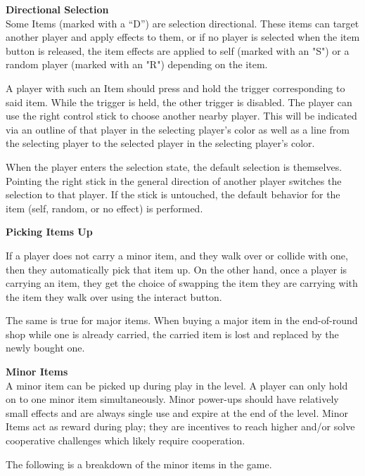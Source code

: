 \par
\textbf{Directional Selection}
\label{sec:dir-sel}
\\
Some Items (marked with a “D”) are selection directional. These items can target another player and apply effects to them, or if no player is selected when the item button is released, the item effects are applied to self (marked with an "S") or a random player (marked with an "R") depending on the item.
\par
A player with such an Item should press and hold the trigger corresponding to said item. While the trigger is held, the other trigger is disabled. The player can use the right control stick to choose another nearby player. This will be indicated via an outline of that player in the selecting player’s color as well as a line from the selecting player to the selected player in the selecting player’s color.
\par
When the player enters the selection state, the default selection is themselves. Pointing the right stick in the general direction of another player switches the selection to that player. If the stick is untouched, the default behavior for the item (self, random, or no effect) is performed.

\textbf{Picking Items Up}

If a player does not carry a minor item, and they walk over or collide with one, then they automatically pick that item up. On the other hand, once a player is carrying an item, they get the choice of swapping the item they are carrying with the item they walk over using the interact button.

The same is true for major items. When buying a major item in the end-of-round shop while one is already carried, the carried item is lost and replaced by the newly bought one.


\par
\textbf{Minor Items}
\\
A minor item can be picked up during play in the level. A player can only hold on to one minor item simultaneously. Minor power-ups should have relatively small effects and are always single use and expire at the end of the level. Minor Items act as reward during play; they are incentives to reach higher and/or solve cooperative challenges which likely require cooperation.
\par
The following is a breakdown of the minor items in the game.

